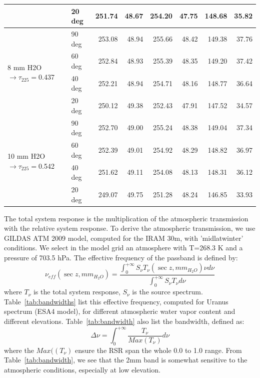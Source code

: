\begin{table}[h]
\begin{tabular}{|l|l|r|r|r|r|r|r|}
 & 20 deg & 251.74 & 48.67 & 254.20 & 47.75 & 148.68 & 35.82 \\
\hline
\multirow{4}{*}{8 mm H2O $\rightarrow \tau_{225}=$0.437} & 90 deg &  253.08 & 48.94 & 255.66 & 48.42 & 149.38 & 37.76 \\
 & 60 deg & 252.84 & 48.93 & 255.39 & 48.35 & 149.20 & 37.42 \\
 & 40 deg & 252.21 & 48.94 & 254.71 & 48.16 & 148.77 & 36.64 \\
 & 20 deg & 250.12 & 49.38 & 252.43 & 47.91 & 147.52 & 34.57 \\
\hline
\multirow{4}{*}{10 mm H2O $\rightarrow \tau_{225}=$0.542} & 90 deg &  252.70 & 49.00 & 255.24 & 48.38 & 149.04 & 37.34 \\
 & 60 deg & 252.39 & 49.01 & 254.92 & 48.29 & 148.82 & 36.97 \\
 & 40 deg & 251.62 & 49.11 & 254.08 & 48.13 & 148.31 & 36.12 \\
 & 20 deg & 249.07 & 49.75 & 251.28 & 48.24 & 146.85 & 33.93 \\
\hline
\end{tabular}
\end{table}


The total system response is the multiplication of the atmospheric
transmission with the relative system response. To derive the
atmospheric transmission, we use GILDAS ATM 2009 model, computed for
the IRAM 30m, with 'midlatwinter' conditions. We select in the model
grid an atmosphere with T=268.3 K and a pressure of 703.5 hPa. The
effective frequency of the passband is defined by:
\begin{equation}
\nu_{eff}( \sec z, mm_{H_{2}O}) = \frac{ \int_{0}^{+\infty} S_{\nu}
  T_{\nu}(\sec z, mm_{H_{2}O}) \nu d\nu } { \int_{0}^{+\infty} S_{\nu} T_{\nu} d\nu}
\label{eq:nueff0}
\end{equation}
where $T_{\nu}$ is the total system response, $S_{\nu}$ is the source
spectrum. Table~\ref{tab:bandwidths} list this effective frequency,
computed for Uranus spectrum (ESA4 model), for different atmospheric
water vapor content and different elevations. 
Table~\ref{tab:bandwidth} also list the bandwidth, defined as:
\begin{equation}
\Delta\nu = \int_{0}^{+\infty} \frac{T_{\nu}}{Max(T_{\nu})}
d\nu
\end{equation}
where the $Max((T_{\nu})$ ensure the RSR span the whole 0.0 to 1.0 range.
From Table~\ref{tab:bandwidth}, we see that the 2mm band is somewhat
sensitive to the atmospheric conditions, especially at low elevation.


